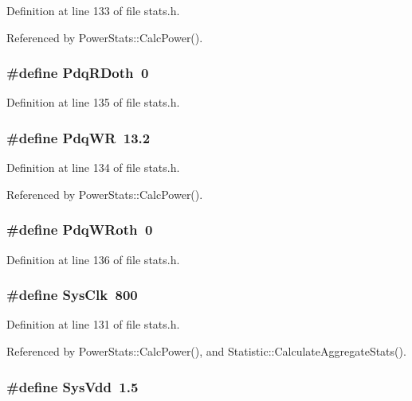 Definition at line 133 of file stats.h.

Referenced by PowerStats::CalcPower().
\subsubsection[{PdqRDoth}]{\setlength{\rightskip}{0pt plus 5cm}\#define PdqRDoth~0}\label{stats_8h_5b3dbfa6218f120df64b2a07feffe5d1}




Definition at line 135 of file stats.h.
\subsubsection[{PdqWR}]{\setlength{\rightskip}{0pt plus 5cm}\#define PdqWR~13.2}\label{stats_8h_fb5be3519c2b3be2d6c09792695ba16c}




Definition at line 134 of file stats.h.

Referenced by PowerStats::CalcPower().
\subsubsection[{PdqWRoth}]{\setlength{\rightskip}{0pt plus 5cm}\#define PdqWRoth~0}\label{stats_8h_f5887b73db74a294da7a07874deacdc6}




Definition at line 136 of file stats.h.
\subsubsection[{SysClk}]{\setlength{\rightskip}{0pt plus 5cm}\#define SysClk~800}\label{stats_8h_d44e93f53acd19749e32d59abcb8554f}




Definition at line 131 of file stats.h.

Referenced by PowerStats::CalcPower(), and Statistic::CalculateAggregateStats().
\subsubsection[{SysVdd}]{\setlength{\rightskip}{0pt plus 5cm}\#define SysVdd~1.5}\label{stats_8h_a449d2aa9ca7e0674660afe8179df839}




